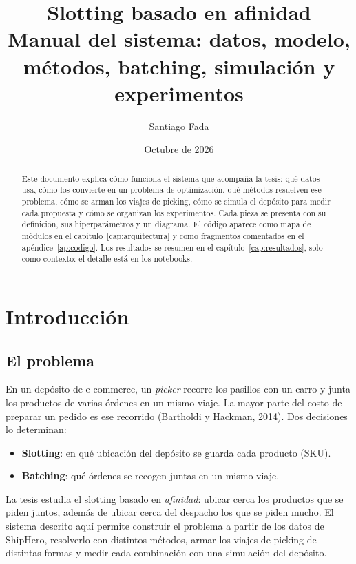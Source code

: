 \documentclass[11pt,a4paper,oneside]{report}
\title{\textbf{Slotting basado en afinidad}\\[4pt]
  \large Manual del sistema: datos, modelo, métodos, batching, simulación y experimentos}
\author{Santiago Fada}
\date{Octubre de 2026}
\begin{document}
\maketitle

\begin{abstract}
Este documento explica cómo funciona el sistema que acompaña la tesis: qué datos usa, cómo
los convierte en un problema de optimización, qué métodos resuelven ese problema, cómo se
arman los viajes de picking, cómo se simula el depósito para medir cada propuesta y cómo se
organizan los experimentos. Cada pieza se presenta con su definición, sus hiperparámetros y
un diagrama. El código aparece como mapa de módulos en el capítulo~\ref{cap:arquitectura} y
como fragmentos comentados en el apéndice~\ref{ap:codigo}. Los resultados se resumen en el
capítulo~\ref{cap:resultados}, solo como contexto: el detalle está en los notebooks.
\end{abstract}

\tableofcontents

\chapter{Introducción}
\label{cap:introduccion}

\section{El problema}

En un depósito de e-commerce, un \emph{picker} recorre los pasillos con un carro y junta los
productos de varias órdenes en un mismo viaje. La mayor parte del costo de preparar un pedido
es ese recorrido (Bartholdi y Hackman, 2014). Dos decisiones lo determinan:

\begin{itemize}
  \item \textbf{Slotting}: en qué ubicación del depósito se guarda cada producto (SKU).
  \item \textbf{Batching}: qué órdenes se recogen juntas en un mismo viaje.
\end{itemize}

La tesis estudia el slotting basado en \emph{afinidad}: ubicar cerca los productos que se
piden juntos, además de ubicar cerca del despacho los que se piden mucho. El sistema
descrito aquí permite construir el problema a partir de los datos de ShipHero, resolverlo con
distintos métodos, armar los viajes de picking de distintas formas y medir cada combinación
con una simulación del depósito.
\end{document}
